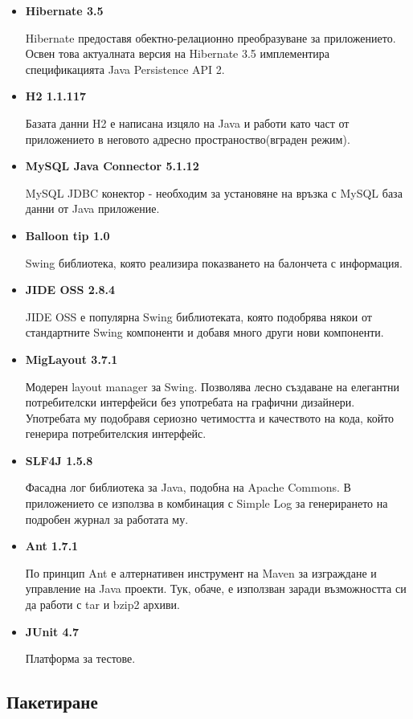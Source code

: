 \begin{itemize}
  \item \textbf{Hibernate 3.5}

    Hibernate предоставя обектно-релационно преобразуване за
    приложението. Освен това актуалната версия на Hibernate 3.5
    имплементира спецификацията Java Persistence API 2.
  \item \textbf{H2 1.1.117}

    Базата данни H2 е написана изцяло на Java и работи като част от
    приложението в неговото адресно пространоство(вграден режим).
  \item \textbf{MySQL Java Connector 5.1.12}

    MySQL JDBC конектор - необходим за установяне на връзка с MySQL
    база данни от Java приложение.
  \item \textbf{Balloon tip 1.0}

    Swing библиотека, която реализира показването на балончета с
    информация. 
  \item \textbf{JIDE OSS 2.8.4}

    JIDE OSS е популярна Swing библиотеката, която подобрява някои от
    стандартните Swing компоненти и добавя много други нови компоненти.
  \item \textbf{MigLayout 3.7.1}

    Модерен layout manager за Swing. Позволява лесно създаване на
    елегантни потребителски интерфейси без употребата на графични
    дизайнери. Употребата му подобравя сериозно четимостта и
    качеството на кода, който генерира потребителския интерфейс.
  \item \textbf{SLF4J 1.5.8}

    Фасадна лог библиотека за Java, подобна на Apache Commons. В
    приложението се използва в комбинация с Simple Log за генерирането
    на подробен журнал за работата му.
  \item \textbf{Ant 1.7.1}

    По принцип Ant е алтернативен инструмент на Maven за изграждане и
    управление на Java проекти. Тук, обаче, е използван заради
    възможността си да работи с tar и bzip2 архиви.
  \item \textbf{JUnit 4.7}

    Платформа за тестове.
\end{itemize}
\subsection{Пакетиране}

